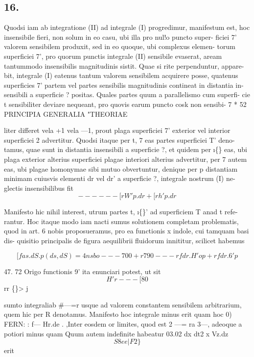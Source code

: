 \documentclass[12pt,a4paper]{article}
\begin{document}
\subsection*{16.}

Quodsi iam ab integratione (II) ad integrale (I) progredimur, manifestum
est, hoc insensibile fieri, non solum in eo casu, ubi illa pro nul!o puncto super-
ficiei 7' valorem sensibilem produxit, sed in eo quoque, ubi complexus elemen-
torum superficiei 7', pro quorum punctis integrale (II) sensibile evaserat, aream
tantummodo insensibilis magnitudinis sistit. Quae si rite perpenduntur, appare-
bit, integrale (I) eatenus tantum valorem sensibilem acquirere posse, quatenus
superficies 7' partem vel partes sensibilis magnitudinis contineat in distantia in-
sensibili a superficie ? positas.  Quales partes quum a parallelismo cum superfi-
cie t sensibiliter deviare nequeant, pro quovis earum puncto cosk non sensibi-
7 *
52                                       PRINCIPIA GENERALIA "THEORIAE

liter differet vela +1 vela ---1, prout plaga superficiei 7' exterior vel interior
superficiei 2 advertitur.             Quodsi itaque per t, 7 eas partes superficiei T' deno-
tamus, quae sunt in distantia insensibili a superficie ?, et quidem per \i\{\} eas, ubi
plaga exterior alterius superficiei plagae interiori alterius advertitur, per 7 autem
eas, ubi plagae homonymae sibi mutuo obvertuntur, denique per p distantiam
minimam cuiusvis elementi dr vel dr' a superficie ?, integrale nostrum (I) ne-
glectis insensibilibus fit
\[                                         --- --- [rW'p.dr+ [rh'p.dr\]

Manifesto hic nihil interest, utrum partes t, \i\{\}' ad superficiem                                      T anad t refe-
rantur.
Hoc itaque modo iam nacti sumus solutionem completam problematis, quod
in art. 6 nobis proposueramus, pro ea functionis x indole, cui tamquam basi dis-
quisitio principalis de figura aequilibrii fluidorum innititur, scilicet habemus

\[       [fas.dS.p(ds,dS) = 4nsbo --- 700 +r790 ---rfdr.H' op+rfdr.6'p\]


47.                                72
Origo functionis          9' ita enunciari potest, ut sit
\[                                                H'r ---         [8                     0\]
rr             \guillemotleft\{\}>                                              j

sumto integraliab                  \#---=r usque ad valorem constantem sensibilem arbitrarium,
quem      hic per          R   denotamus.        Manifesto hoc integrale minus erit quam hoc
0)                         FERN:   :
f---
Hr.de       .
,Inter eosdem
or
limites, quod est              2
---= ra       3---,          adeoque a potiori   minus
quam                 Quum autem indefinite habeatur
03.02 dx                   dt2    x                   Vz.dz
\[                               S     8 ee                           |                     F2\}\]
erit
\end{document}
